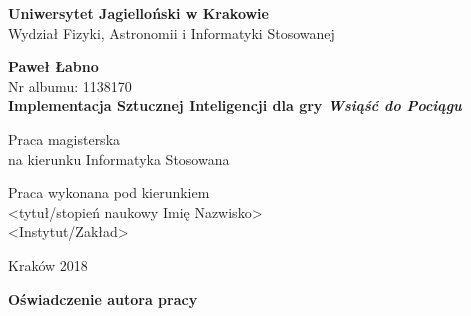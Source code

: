 \documentclass[12pt, oneside]{report}
\begin{document}
  
\setcounter{tocdepth}{1} %
\thispagestyle{empty}
\begin{titlepage}
    \begin{center}

           \Large
	\textbf{Uniwersytet Jagielloński w Krakowie}\vspace{0.2cm}\\ Wydział Fizyki, Astronomii i Informatyki Stosowanej
               \vspace*{1cm}
               
         \vspace{3cm}
         \Large
          \textbf{Paweł Łabno}\\\vspace{0.5cm}
         \normalsize Nr albumu: 1138170\\
             \vspace{2cm}
        \Huge
        \textbf{Implementacja Sztucznej Inteligencji dla gry \textit{Wsiąść do Pociągu}}
      
        \vspace{1.5cm}
        \normalsize
        Praca magisterska\\
        na kierunku Informatyka Stosowana\\ \vspace{0.15cm}
        
        \vfill
        \vspace{2cm}
       \begin{minipage}{1\textwidth}
\begin{flushright}
Praca wykonana pod kierunkiem\\
<tytuł/stopień naukowy Imię Nazwisko>\\
<Instytut/Zakład>
\end{flushright}
\end{minipage}
        
        \vspace{2cm}
        \begin{center}
      Kraków 2018
        \end{center}
    \end{center}
\end{titlepage}

\newpage 
 \thispagestyle{empty}
\vspace{2.5cm}
\begin{flushleft}
\large \textbf{Oświadczenie autora pracy}\vspace{0.6cm}\\
\end{flushleft}
\end{document}
